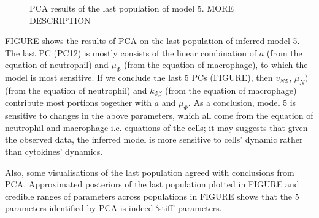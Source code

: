 \begin{figure}[H]
    \begin{center}
    \end{center}

    \caption[PCA results of the last population of model 5]{PCA results of the last population of model 5. MORE DESCRIPTION}
    \label{fig:pc_pie}
\end{figure}


FIGURE shows the results of PCA on the last population of inferred model 5. The last PC (PC12) is mostly consists of the linear combination of $a$ (from the equation of neutrophil) and $\mu_\Phi$ (from the equation of macrophage), to which the model is most sensitive. If we conclude the last 5 PCs (FIGURE), then $v_{N\Phi}$, $\mu_N)$ (from the equation of neutrophil) and $k_{\Phi\beta}$ (from the equation of macrophage) contribute most portions together with $a$ and $\mu_\Phi$. As a conclusion, model 5 is sensitive to changes in the above parameters, which all come from the equation of neutrophil and macrophage i.e. equations of the cells; it may suggests that given the observed data, the inferred model is more sensitive to cells' dynamic rather than cytokines' dynamics.

Also, some visualisations of the last population agreed with conclusions from PCA. Approximated posteriors of the last population plotted in FIGURE and credible ranges of parameters across populations in FIGURE shows that the 5 parameters identified by PCA is indeed `stiff' parameters.
